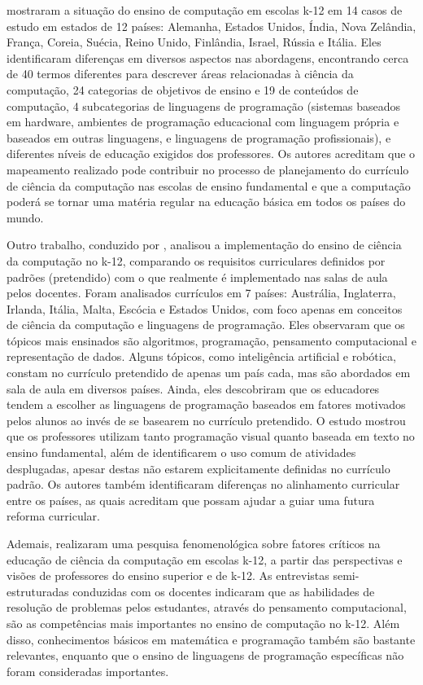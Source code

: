 \citet{hubwieser2015global} mostraram a situação do ensino de computação em escolas k-12 em 14 casos de estudo em estados de 12 países: Alemanha, Estados Unidos, Índia, Nova Zelândia, França, Coreia, Suécia, Reino Unido, Finlândia, Israel, Rússia e Itália. Eles identificaram diferenças em diversos aspectos nas abordagens, encontrando cerca de 40 termos diferentes para descrever áreas relacionadas à ciência da computação, 24 categorias de objetivos de ensino e 19 de conteúdos de computação, 4 subcategorias de linguagens de programação (sistemas baseados em hardware, ambientes de programação educacional com linguagem própria e baseados em outras linguagens, e linguagens de programação profissionais), e diferentes níveis de educação exigidos dos professores. Os autores acreditam que o mapeamento realizado pode contribuir no processo de planejamento do currículo de ciência da computação nas escolas de ensino fundamental e que a computação poderá se tornar uma matéria regular na educação básica em todos os países do mundo.

Outro trabalho, conduzido por \citet{falkner2019international}, analisou a implementação do ensino de ciência da computação no k-12, comparando os requisitos curriculares definidos por padrões (pretendido) com o que realmente é implementado nas salas de aula pelos docentes. Foram analisados currículos em 7 países: Austrália, Inglaterra, Irlanda, Itália, Malta, Escócia e Estados Unidos, com foco apenas em conceitos de ciência da computação e linguagens de programação. Eles observaram que os tópicos mais ensinados são algoritmos, programação, pensamento computacional e representação de dados. Alguns tópicos, como inteligência artificial e robótica, constam no currículo pretendido de apenas um país cada, mas são abordados em sala de aula em diversos países. Ainda, eles descobriram que os educadores tendem a escolher as linguagens de programação baseados em fatores motivados pelos alunos ao invés de se basearem no currículo pretendido. O estudo mostrou que os professores utilizam tanto programação visual quanto baseada em texto no ensino fundamental, além de identificarem o uso comum de atividades desplugadas, apesar destas não estarem explicitamente definidas no currículo padrão. Os autores também identificaram diferenças no alinhamento curricular entre os países, as quais acreditam que possam ajudar a guiar uma futura reforma curricular.

Ademais, \citet{zhu2023core} realizaram uma pesquisa fenomenológica sobre fatores críticos na educação de ciência da computação em escolas k-12, a partir das perspectivas e visões de professores do ensino superior e de k-12. As entrevistas semi-estruturadas conduzidas com os docentes indicaram que as habilidades de resolução de problemas pelos estudantes, através do pensamento computacional, são as competências mais importantes no ensino de computação no k-12. Além disso, conhecimentos básicos em matemática e programação também são bastante relevantes, enquanto que o ensino de linguagens de programação específicas não foram consideradas importantes.

